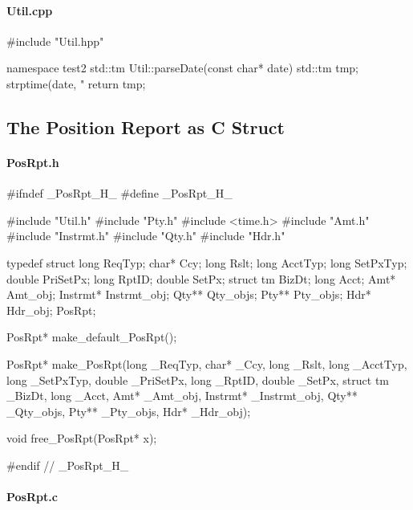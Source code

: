 \documentclass[submission]{eptcs}
\begin{document}
\paragraph{Util.cpp}

\begin{cppcode}
#include "Util.hpp"

namespace test2 {
  std::tm Util::parseDate(const char* date) {
    std::tm tmp;
    strptime(date, "%
    return tmp;
  }
}
\end{cppcode}


\subsection{The Position Report as C Struct}
\label{sec:posrpt:c}

\paragraph{PosRpt.h}

\begin{ccode}
#ifndef _PosRpt_H_
#define _PosRpt_H_

#include "Util.h"
#include "Pty.h"
#include <time.h>
#include "Amt.h"
#include "Instrmt.h"
#include "Qty.h"
#include "Hdr.h"

typedef struct {
  long ReqTyp;
  char* Ccy;
  long Rslt;
  long AcctTyp;
  long SetPxTyp;
  double PriSetPx;
  long RptID;
  double SetPx;
  struct tm BizDt;
  long Acct;
  Amt* Amt_obj;
  Instrmt* Instrmt_obj;
  Qty** Qty_objs;
  Pty** Pty_objs;
  Hdr* Hdr_obj;
} PosRpt;

PosRpt* make_default_PosRpt();

PosRpt* make_PosRpt(long _ReqTyp, char* _Ccy, long _Rslt, long _AcctTyp, long _SetPxTyp, double _PriSetPx,
                    long _RptID, double _SetPx, struct tm _BizDt, long _Acct, Amt* _Amt_obj,
                    Instrmt* _Instrmt_obj, Qty** _Qty_objs, Pty** _Pty_objs, Hdr* _Hdr_obj);

void free_PosRpt(PosRpt* x);

#endif // _PosRpt_H_
\end{ccode}

\paragraph{PosRpt.c}
\end{document}
